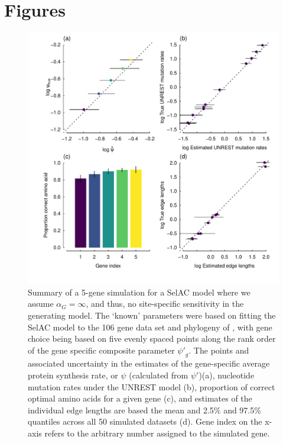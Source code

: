 \documentclass[onecolumn,letterpaper,fleqn,nogrid]{myMBE}%
\newcommand{\alphag}{\ensuremath{\alpha_G}\xspace}
\newcommand{\psiprime}{\ensuremath{\psi'}\xspace}
\begin{document}
\section{Figures}

\begin{figure}[H]
  \centering
  \includegraphics[width=0.9\linewidth]{FIGURE_1_5genes_All_UNREST_WITHGAMMA.pdf}
  \caption{Summary of a 5-gene simulation for a SelAC model where we assume $\alphag = \infty$, and thus, no site-specific sensitivity in the generating model.
    The `known' parameters were based on fitting the SelAC model to the 106 gene data set and phylogeny of \citet{RokasEtAl2003}, with gene choice being based on five evenly spaced points along the rank order of the gene specific composite parameter $\psiprime_g$.
                The points and associated uncertainty in the estimates of the gene-specific average protein synthesis rate, or $\psi$ (calculated from $\psiprime$)(a), nucleotide mutation rates under the UNREST model (b), proportion of correct optimal amino acids for a given gene (c), and estimates of the individual edge lengths are based the mean and 2.5\% and 97.5\% quantiles across all 50 simulated datasets (d).
                Gene index on the x-axis refers to the arbitrary number assigned to the simulated gene.
    }
  \label{fig:SelacWithGSimRes}
\end{figure}
\end{document}
